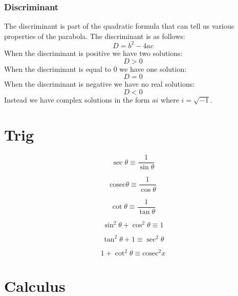 \documentclass{article}
\begin{document}
\subsubsection{Discriminant}
The discriminant is part of the quadratic formula that can tell us various properties of the parabola.
The discriminant is as follows:
\begin{equation}
	D = b^2 - 4ac
\end{equation}
When the discriminant is positive we have two solutions:
\begin{equation}
	D > 0
\end{equation}
When the discriminant is equal to $0$ we have one solution:
\begin{equation}
	D = 0
\end{equation}
When the discriminant is negative we have no real solutions:
\begin{equation}
	D < 0
\end{equation}
Instead we have complex solutions in the form $ai$ where $i = \sqrt{-1}$.

\section{Trig}

\begin{equation}
	\sec \theta \equiv \frac{1}{\sin \theta}
\end{equation}


\begin{equation}
	\mathrm{cosec} \theta \equiv \frac{1}{\cos \theta}
\end{equation}

\begin{equation}
	\cot \theta \equiv \frac{1}{\tan \theta}
\end{equation}

\begin{equation}
	\sin^2 \theta  + \cos^2 \theta \equiv 1
\end{equation}

\begin{equation}
	\tan^2 \theta + 1 \equiv \sec^2 \theta
\end{equation}

\begin{equation}
	1 + \cot^2 \theta \equiv \mathrm{cosec}^2 x
\end{equation}

\section{Calculus}
\end{document}
